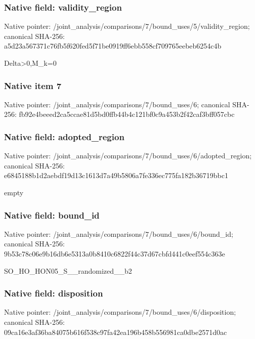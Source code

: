 \documentclass[10pt,a4paper]{article}
\begin{document}
\subsubsection{Native field: validity\_\allowbreak{}region}
Native pointer: /joint\_\allowbreak{}analysis/comparisons/7/bound\_\allowbreak{}uses/5/validity\_\allowbreak{}region; canonical SHA-256: a5d23a567371c76fb5f620fed5f71be0919ff6ebb558cf709765eebeb6254c4b

\begingroup\raggedright\sloppy Delta>0,\allowbreak{}M\_\allowbreak{}k=\allowbreak{}0\par\endgroup

\subsubsection{Native item 7}
Native pointer: /joint\_\allowbreak{}analysis/comparisons/7/bound\_\allowbreak{}uses/6; canonical SHA-256: fb92e4beeed2ca5ccae81d5bd0ffb44b4c121bf0c9a453b2f42caf3bff057cbc

\subsubsection{Native field: adopted\_\allowbreak{}region}
Native pointer: /joint\_\allowbreak{}analysis/comparisons/7/bound\_\allowbreak{}uses/6/adopted\_\allowbreak{}region; canonical SHA-256: e6845188b1d2aebdf19d13c1613d7a49b5806a7fe336ec775fa182b36719bbc1

\begingroup\raggedright\sloppy empty\par\endgroup

\subsubsection{Native field: bound\_\allowbreak{}id}
Native pointer: /joint\_\allowbreak{}analysis/comparisons/7/bound\_\allowbreak{}uses/6/bound\_\allowbreak{}id; canonical SHA-256: 9b53c78c06e9b16db6e5313a0b8410c6822f44c37d67cbfd441c0eef554c363e

\begingroup\raggedright\sloppy SO\_\allowbreak{}HO\_\allowbreak{}HON05\_\allowbreak{}S\_\allowbreak{}\_\allowbreak{}randomized\_\allowbreak{}\_\allowbreak{}b2\par\endgroup

\subsubsection{Native field: disposition}
Native pointer: /joint\_\allowbreak{}analysis/comparisons/7/bound\_\allowbreak{}uses/6/disposition; canonical SHA-256: 09ca16e3af36ba84075b616f538c97fa42ea196b458b556981ca0dbe2571d0ac
\end{document}
